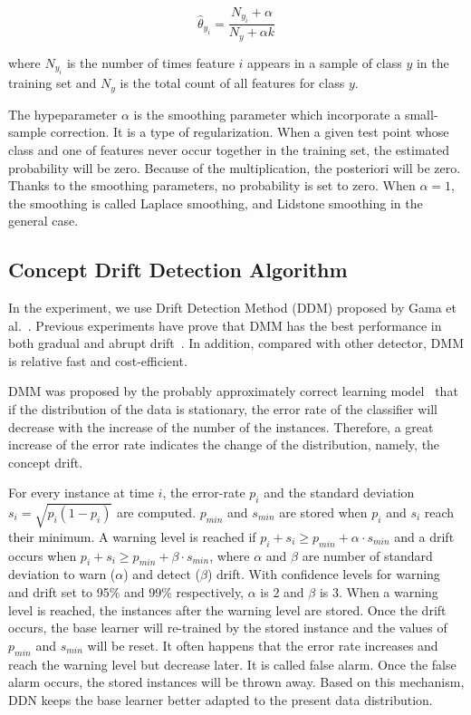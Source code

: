 \begin{equation}
\hat{\theta}_{y_i} = \frac{N_{y_i} + \alpha}{N_y+\alpha k}
\end{equation}

where $N_{y_i}$ is the number of times feature $i$ appears in a sample of class $y$ in the training set and $N_y$ is the total count of all features for class $y$.

The hypeparameter $\alpha$ is the smoothing parameter which incorporate a small-sample correction. It is a type of regularization. When a given test point whose class and one of features never occur together in the training set, the estimated probability will be zero. Because of the multiplication, the posteriori will be zero. Thanks to the smoothing parameters, no probability is set to zero. When $\alpha=1$, the smoothing is called Laplace smoothing, and Lidstone smoothing in the general case.

\subsection{Concept Drift Detection Algorithm}

In the experiment, we use Drift Detection Method (DDM) proposed by Gama et al.~\cite{gama2004learning}. Previous experiments have prove that DMM has the best performance in both gradual and abrupt drift~\cite{Goncalves2014}. In addition, compared with other detector, DMM is relative fast and cost-efficient. 

DMM was proposed by the probably approximately correct learning model~\cite{michalski2013machine} that if the distribution of the data is stationary, the error rate of the classifier will decrease with the increase of the number of the instances. Therefore, a great increase of the error rate indicates the change of the distribution, namely, the concept drift. 

For every instance at time $i$, the error-rate $p_i$ and the standard deviation $s_i = \sqrt{p_i(1-p_i)}$ are computed. $p_{min}$ and $s_{min}$ are stored when $p_i$ and $s_i$ reach their minimum. A warning level is reached if $p_i + s_i \geq p_{min} + \alpha \cdot s_{min} $ and a drift occurs when $p_i + s_i \geq p_{min} +\beta \cdot s_{min}$, where $\alpha$ and $\beta$ are number of standard deviation to warn ($\alpha$) and detect ($\beta$) drift. With confidence levels for warning and drift set to 95\% and 99\% respectively, $\alpha$ is $2$ and $\beta$ is $3$. When a warning level is reached, the instances after the warning level are stored. Once the drift occurs, the base learner will re-trained by the stored instance and the values of $p_{min}$ and $s_{min}$ will be reset. It often happens that the error rate increases and reach the warning level but decrease later. It is called false alarm. Once the false alarm occurs, the stored instances will be thrown away. Based on this mechanism, DDN keeps the base learner better adapted to the present data distribution.


